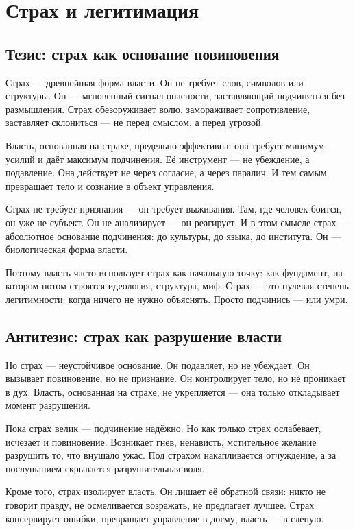 \chapter{Страх и легитимация}

\section{Тезис: страх как основание повиновения}

Страх — древнейшая форма власти. Он не требует слов, символов или структуры. Он — мгновенный сигнал опасности, заставляющий подчиняться без размышления. Страх обезоруживает волю, замораживает сопротивление, заставляет склониться — не перед смыслом, а перед угрозой.

Власть, основанная на страхе, предельно эффективна: она требует минимум усилий и даёт максимум подчинения. Её инструмент — не убеждение, а подавление. Она действует не через согласие, а через паралич. И тем самым превращает тело и сознание в объект управления.

Страх не требует признания — он требует выживания. Там, где человек боится, он уже не субъект. Он не анализирует — он реагирует. И в этом смысле страх — абсолютное основание подчинения: до культуры, до языка, до института. Он — биологическая форма власти.

Поэтому власть часто использует страх как начальную точку: как фундамент, на котором потом строятся идеология, структура, миф. Страх — это нулевая степень легитимности: когда ничего не нужно объяснять. Просто подчинись — или умри.

\section{Антитезис: страх как разрушение власти}

Но страх — неустойчивое основание. Он подавляет, но не убеждает. Он вызывает повиновение, но не признание. Он контролирует тело, но не проникает в дух. Власть, основанная на страхе, не укрепляется — она только откладывает момент разрушения.

Пока страх велик — подчинение надёжно. Но как только страх ослабевает, исчезает и повиновение. Возникает гнев, ненависть, мстительное желание разрушить то, что внушало ужас. Под страхом накапливается отчуждение, а за послушанием скрывается разрушительная воля.

Кроме того, страх изолирует власть. Он лишает её обратной связи: никто не говорит правду, не осмеливается возражать, не предлагает лучшее. Страх консервирует ошибки, превращает управление в догму, власть — в слепую.

